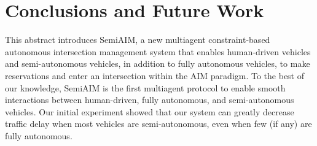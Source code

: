 \section{Conclusions and Future Work}
\label{sec:conclusions}

This abstract introduces SemiAIM, a new multiagent constraint-based
autonomous intersection management system that enables human-driven
vehicles and semi-autonomous vehicles, in addition to fully autonomous
vehicles, to make reservations and enter an intersection within the
AIM paradigm.  To the best of our knowledge, SemiAIM is the first
multiagent protocol to enable smooth interactions between
human-driven, fully autonomous, and semi-autonomous vehicles.  Our
initial
experiment showed that our system can greatly decrease
traffic delay when most vehicles are semi-autonomous, even when few
(if any) are fully autonomous.











